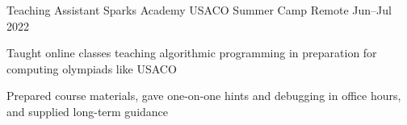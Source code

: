 \experience
{Teaching Assistant}
{Sparks Academy USACO Summer Camp}
{Remote}
{Jun--Jul 2022}
{
	\item Taught online classes teaching algorithmic programming in preparation for computing olympiads like USACO
	\item Prepared course materials, gave one-on-one hints and debugging in office hours, and supplied long-term guidance	
}
